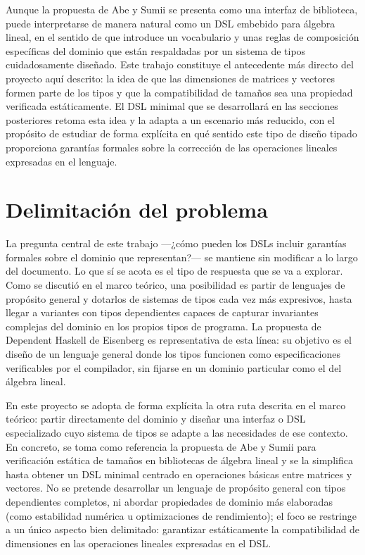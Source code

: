 \documentclass[conference]{IEEEtran}
\begin{document}
Aunque la propuesta de Abe y Sumii se presenta como una interfaz de biblioteca, puede interpretarse de manera natural como un DSL embebido para álgebra lineal, en el sentido de que introduce un vocabulario y unas reglas de composición específicas del dominio que están respaldadas por un sistema de tipos cuidadosamente diseñado. Este trabajo constituye el antecedente más directo del proyecto aquí descrito: la idea de que las dimensiones de matrices y vectores formen parte de los tipos y que la compatibilidad de tamaños sea una propiedad verificada estáticamente. El DSL minimal que se desarrollará en las secciones posteriores retoma esta idea y la adapta a un escenario más reducido, con el propósito de estudiar de forma explícita en qué sentido este tipo de diseño tipado proporciona garantías formales sobre la corrección de las operaciones lineales expresadas en el lenguaje.


\section{Delimitación del problema}

La pregunta central de este trabajo —¿cómo pueden los DSLs incluir garantías formales sobre el dominio que representan?— se mantiene sin modificar a lo largo del documento. Lo que sí se acota es el tipo de respuesta que se va a explorar. Como se discutió en el marco teórico, una posibilidad es partir de lenguajes de propósito general y dotarlos de sistemas de tipos cada vez más expresivos, hasta llegar a variantes con tipos dependientes capaces de capturar invariantes complejas del dominio en los propios tipos de programa. La propuesta de Dependent Haskell de Eisenberg \cite{eisenberg2016} es representativa de esta línea: su objetivo es el diseño de un lenguaje general donde los tipos funcionen como especificaciones verificables por el compilador, sin fijarse en un dominio particular como el del álgebra lineal.

En este proyecto se adopta de forma explícita la otra ruta descrita en el marco teórico: partir directamente del dominio y diseñar una interfaz o DSL especializado cuyo sistema de tipos se adapte a las necesidades de ese contexto. En concreto, se toma como referencia la propuesta de Abe y Sumii para verificación estática de tamaños en bibliotecas de álgebra lineal \cite{abe2015} y se la simplifica hasta obtener un DSL minimal centrado en operaciones básicas entre matrices y vectores. No se pretende desarrollar un lenguaje de propósito general con tipos dependientes completos, ni abordar propiedades de dominio más elaboradas (como estabilidad numérica u optimizaciones de rendimiento); el foco se restringe a un único aspecto bien delimitado: garantizar estáticamente la compatibilidad de dimensiones en las operaciones lineales expresadas en el DSL.
\end{document}
